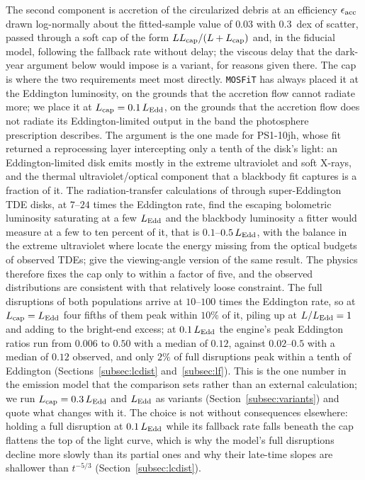 \documentclass[twocolumn,pdftex]{aastex701}
\newcommand{\mosfit}{{\tt MOSFiT}\xspace}
\begin{document}
The second component is accretion of the circularized debris at an efficiency $\epsilon_{\rm acc}$ drawn log-normally about the fitted-sample value of $0.03$ with $0.3$~dex of scatter, passed through a soft cap of the form $L L_{\rm cap}/(L + L_{\rm cap})$ and, in the fiducial model, following the fallback rate without delay; the viscous delay that the dark-year argument below would impose is a variant, for reasons given there. The cap is where the two requirements meet most directly. \mosfit has always placed it at the Eddington luminosity, on the grounds that the accretion flow cannot radiate more; we place it at $L_{\rm cap} = 0.1\, L_{\rm Edd}$, on the grounds that the accretion flow does not radiate its Eddington-limited output in the band the photosphere prescription describes. The argument is the one \citet{Guillochon:2014a} made for PS1-10jh, whose fit returned a reprocessing layer intercepting only a tenth of the disk's light: an Eddington-limited disk emits mostly in the extreme ultraviolet and soft X-rays, and the thermal ultraviolet/optical component that a blackbody fit captures is a fraction of it. The radiation-transfer calculations of \citet{Thomsen:2022a} through super-Eddington TDE disks, at $7$--$24$ times the Eddington rate, find the escaping bolometric luminosity saturating at a few $L_{\rm Edd}$ and the blackbody luminosity a fitter would measure at a few to ten percent of it, that is $0.1$--$0.5\, L_{\rm Edd}$, with the balance in the extreme ultraviolet where \citet{Lu:2018a} locate the energy missing from the optical budgets of observed TDEs; \citet{Dai:2018a} give the viewing-angle version of the same result. The physics therefore fixes the cap only to within a factor of five, and the observed distributions are consistent with that relatively loose constraint. The full disruptions of both populations arrive at $10$--$100$ times the Eddington rate, so at $L_{\rm cap} = L_{\rm Edd}$ four fifths of them peak within $10\%$ of it, piling up at $L/L_{\rm Edd} = 1$ and adding to the bright-end excess; at $0.1\, L_{\rm Edd}$ the engine's peak Eddington ratios run from $0.006$ to $0.50$ with a median of $0.12$, against $0.02$--$0.5$ with a median of $0.12$ observed, and only $2\%$ of full disruptions peak within a tenth of Eddington (Sections~\ref{subsec:lcdist} and~\ref{subsec:lf}). This is the one number in the emission model that the comparison sets rather than an external calculation; we run $L_{\rm cap} = 0.3\, L_{\rm Edd}$ and $L_{\rm Edd}$ as variants (Section~\ref{subsec:variants}) and quote what changes with it. The choice is not without consequences elsewhere: holding a full disruption at $0.1\, L_{\rm Edd}$ while its fallback rate falls beneath the cap flattens the top of the light curve, which is why the model's full disruptions decline more slowly than its partial ones and why their late-time slopes are shallower than $t^{-5/3}$ (Section~\ref{subsec:lcdist}).
\end{document}

